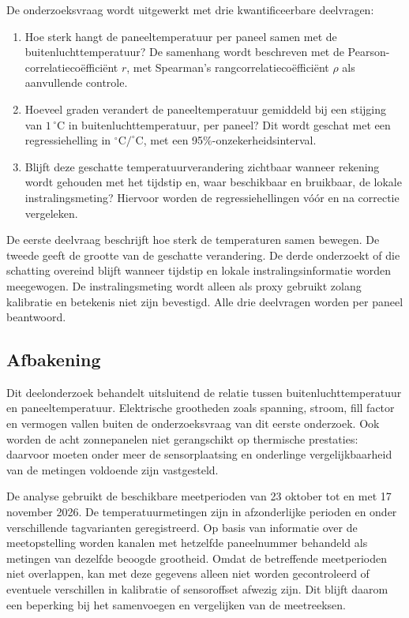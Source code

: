 \documentclass[12pt,a4paper]{article}
\begin{document}
De onderzoeksvraag wordt uitgewerkt met drie kwantificeerbare deelvragen:

\begin{enumerate}
    \item Hoe sterk hangt de paneeltemperatuur per paneel samen met de buitenluchttemperatuur? De samenhang wordt beschreven met de Pearson-correlatiecoëfficiënt \(r\), met Spearman's rangcorrelatiecoëfficiënt \(\rho\) als aanvullende controle.
    \item Hoeveel graden verandert de paneeltemperatuur gemiddeld bij een stijging van \(1\,^\circ\mathrm{C}\) in buitenluchttemperatuur, per paneel? Dit wordt geschat met een regressiehelling in \(^\circ\mathrm{C}/^\circ\mathrm{C}\), met een 95\%-onzekerheidsinterval.
    \item Blijft deze geschatte temperatuurverandering zichtbaar wanneer rekening wordt gehouden met het tijdstip en, waar beschikbaar en bruikbaar, de lokale instralingsmeting? Hiervoor worden de regressiehellingen vóór en na correctie vergeleken.
\end{enumerate}

De eerste deelvraag beschrijft hoe sterk de temperaturen samen bewegen. De tweede geeft de grootte van de geschatte verandering. De derde onderzoekt of die schatting overeind blijft wanneer tijdstip en lokale instralingsinformatie worden meegewogen. De instralingsmeting wordt alleen als proxy gebruikt zolang kalibratie en betekenis niet zijn bevestigd. Alle drie deelvragen worden per paneel beantwoord.

\subsection{Afbakening}

Dit deelonderzoek behandelt uitsluitend de relatie tussen buitenluchttemperatuur en paneeltemperatuur. Elektrische grootheden zoals spanning, stroom, fill factor en vermogen vallen buiten de onderzoeksvraag van dit eerste onderzoek. Ook worden de acht zonnepanelen niet gerangschikt op thermische prestaties: daarvoor moeten onder meer de sensorplaatsing en onderlinge vergelijkbaarheid van de metingen voldoende zijn vastgesteld.

De analyse gebruikt de beschikbare meetperioden van 23 oktober tot en met 17 november 2026. De temperatuurmetingen zijn in afzonderlijke perioden en onder verschillende tagvarianten geregistreerd. Op basis van informatie over de meetopstelling worden kanalen met hetzelfde paneelnummer behandeld als metingen van dezelfde beoogde grootheid. Omdat de betreffende meetperioden niet overlappen, kan met deze gegevens alleen niet worden gecontroleerd of eventuele verschillen in kalibratie of sensoroffset afwezig zijn. Dit blijft daarom een beperking bij het samenvoegen en vergelijken van de meetreeksen.
\end{document}
